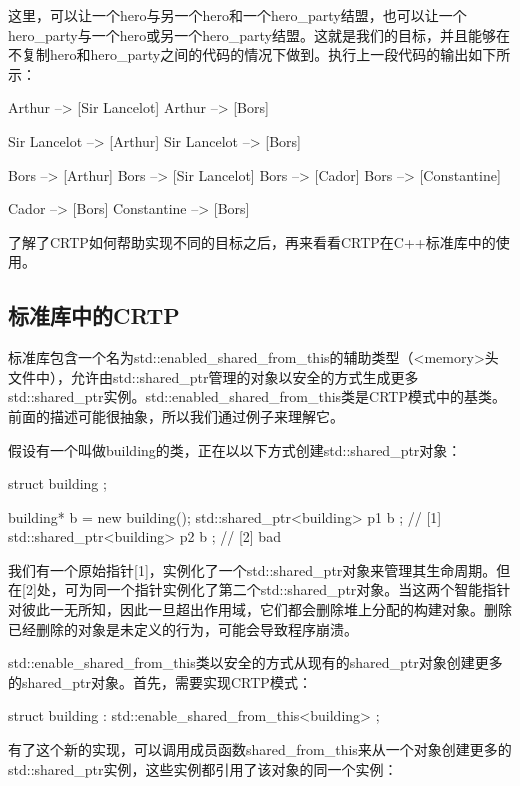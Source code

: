 这里，可以让一个hero与另一个hero和一个hero\_party结盟，也可以让一个hero\_party与一个hero或另一个hero\_party结盟。这就是我们的目标，并且能够在不复制hero和hero\_party之间的代码的情况下做到。执行上一段代码的输出如下所示：

\begin{shell}
Arthur --> [Sir Lancelot]
Arthur --> [Bors]

Sir Lancelot --> [Arthur]
Sir Lancelot --> [Bors]

Bors --> [Arthur]
Bors --> [Sir Lancelot]
Bors --> [Cador]
Bors --> [Constantine]

Cador --> [Bors]
Constantine --> [Bors]
\end{shell}

了解了CRTP如何帮助实现不同的目标之后，再来看看CRTP在C++标准库中的使用。

\subsection{标准库中的CRTP}

标准库包含一个名为std::enabled\_shared\_from\_this的辅助类型（<memory>头文件中），允许由std::shared\_ptr管理的对象以安全的方式生成更多std::shared\_ptr实例。std::enabled\_shared\_from\_this类是CRTP模式中的基类。前面的描述可能很抽象，所以我们通过例子来理解它。

假设有一个叫做building的类，正在以以下方式创建std::shared\_ptr对象：

\begin{cpp}
struct building {};

building* b = new building();
std::shared_ptr<building> p1{ b }; // [1]
std::shared_ptr<building> p2{ b }; // [2] bad
\end{cpp}

我们有一个原始指针[1]，实例化了一个std::shared\_ptr对象来管理其生命周期。但在[2]处，可为同一个指针实例化了第二个std::shared\_ptr对象。当这两个智能指针对彼此一无所知，因此一旦超出作用域，它们都会删除堆上分配的构建对象。删除已经删除的对象是未定义的行为，可能会导致程序崩溃。

std::enable\_shared\_from\_this类以安全的方式从现有的shared\_ptr对象创建更多的shared\_ptr对象。首先，需要实现CRTP模式：

\begin{cpp}
struct building : std::enable_shared_from_this<building>
{
};
\end{cpp}

有了这个新的实现，可以调用成员函数shared\_from\_this来从一个对象创建更多的std::shared\_ptr实例，这些实例都引用了该对象的同一个实例：

